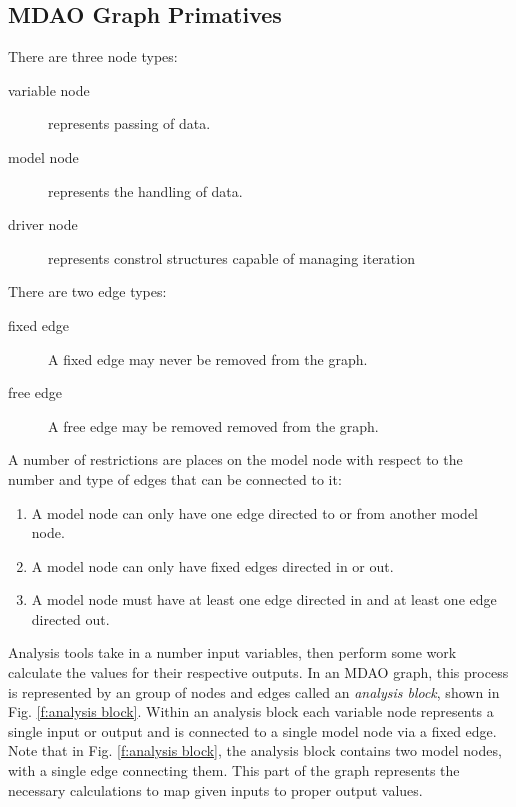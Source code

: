 \subsection{MDAO Graph Primatives}
There are three node types:  
\begin{description}
\item[variable node] represents passing of data.
\item[model node] represents the handling of data.
\item[driver node] represents constrol structures capable of managing iteration
\end{description}
There are two edge types: 
\begin{description}
\item[fixed edge] A fixed edge may never be removed from the graph.
\item[free edge] A free edge may be removed removed from the graph.
\end{description}

A number of restrictions are places on the model node with respect to the number and 
type of edges that can be connected to it: 
\begin{enumerate}
\item A model node can only have one edge directed to or from another model node.
\item A model node can only have fixed edges directed in or out.
\item A model node must have at least one edge directed in and at least one edge directed out.
\end{enumerate}

Analysis tools take in a number input variables, then perform some work calculate 
the values for their respective outputs. In an MDAO graph, this process is 
represented by an group of nodes and edges called an \emph{analysis block}, 
shown in Fig. \ref{f:analysis block}. Within an analysis block each variable 
node represents a single input or output and is connected 
to a single model node via a fixed edge. Note that in Fig. \ref{f:analysis block}, 
the analysis block contains two model nodes, with a single edge connecting them. 
This part of the graph represents the necessary calculations to map given inputs 
to proper output values. 

